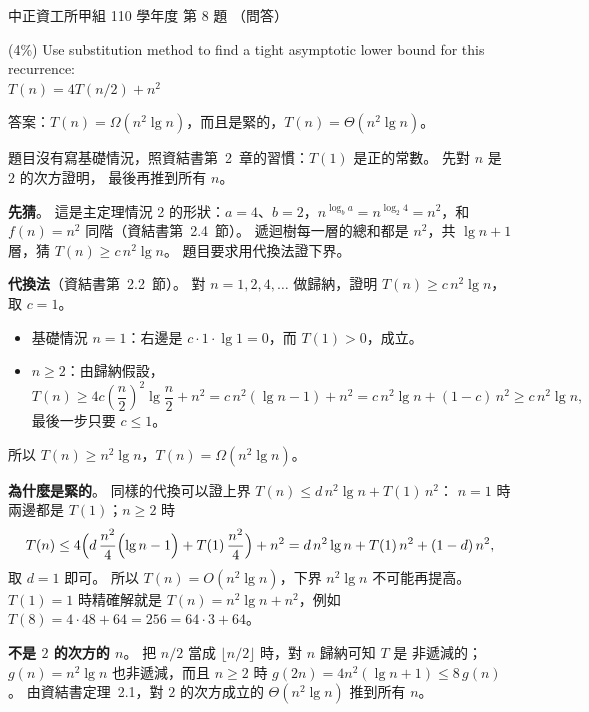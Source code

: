\begin{pastexam}[label={px:ccu-110-swa-06}]{中正資工所甲組 110 學年度 第 8 題}
（問答）

(4\%) Use substitution method to find a tight asymptotic lower bound for this recurrence:\\
$T(n)=4T(n/2)+n^2$
\end{pastexam}

\begin{pastsoln}
答案：$T(n) = \Omega(n^2 \lg n)$，而且是緊的，$T(n) = \Theta(n^2 \lg n)$。

題目沒有寫基礎情況，照資結書第~2~章的習慣：$T(1)$ 是正的常數。 先對 $n$ 是 $2$ 的次方證明，
最後再推到所有 $n$。

\textbf{先猜}。 這是主定理情況 2 的形狀：$a = 4$、$b = 2$，$n^{\log_b a} = n^{\log_2 4} = n^2$，和
$f(n) = n^2$ 同階（資結書第~2.4~節）。 遞迴樹每一層的總和都是 $n^2$，共 $\lg n + 1$ 層，猜
$T(n) \ge c\, n^2 \lg n$。 題目要求用代換法證下界。

\textbf{代換法}（資結書第~2.2~節）。 對 $n = 1, 2, 4, \ldots$ 做歸納，證明 $T(n) \ge c\, n^2 \lg n$，
取 $c = 1$。
\begin{itemize}
\item 基礎情況 $n = 1$：右邊是 $c \cdot 1 \cdot \lg 1 = 0$，而 $T(1) > 0$，成立。
\item $n \ge 2$：由歸納假設，
\[
T(n) \ge 4c \left(\frac{n}{2}\right)^2 \lg \frac{n}{2} + n^2
= c\, n^2 (\lg n - 1) + n^2 = c\, n^2 \lg n + (1 - c)\, n^2 \ge c\, n^2 \lg n ,
\]
最後一步只要 $c \le 1$。
\end{itemize}
所以 $T(n) \ge n^2 \lg n$，$T(n) = \Omega(n^2 \lg n)$。

\textbf{為什麼是緊的}。 同樣的代換可以證上界 $T(n) \le d\, n^2 \lg n + T(1)\, n^2$：
$n = 1$ 時兩邊都是 $T(1)$；$n \ge 2$ 時
\[
T(n) \le 4\Bigl(d\, \frac{n^2}{4}\Bigl(\lg n - 1\Bigr) + T(1)\, \frac{n^2}{4}\Bigr) + n^2
= d\, n^2 \lg n + T(1)\, n^2 + (1 - d)\, n^2 ,
\]
取 $d = 1$ 即可。 所以 $T(n) = O(n^2 \lg n)$，下界 $n^2 \lg n$ 不可能再提高。
$T(1) = 1$ 時精確解就是 $T(n) = n^2 \lg n + n^2$，例如 $T(8) = 4 \cdot 48 + 64 = 256 = 64 \cdot 3 + 64$。

\textbf{不是 $2$ 的次方的 $n$}。 把 $n/2$ 當成 $\lfloor n/2 \rfloor$ 時，對 $n$ 歸納可知 $T$ 是
非遞減的；$g(n) = n^2 \lg n$ 也非遞減，而且 $n \ge 2$ 時 $g(2n) = 4n^2(\lg n + 1) \le 8\, g(n)$。
由資結書定理~2.1，對 $2$ 的次方成立的 $\Theta(n^2 \lg n)$ 推到所有 $n$。
\end{pastsoln}
